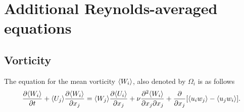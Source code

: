\documentclass[oneside,a4paper,11pt]{report}
\begin{document}
\section{Additional Reynolds-averaged equations}

\subsection{Vorticity}
The equation for the mean vorticity $\langle W_i \rangle$, also denoted by $\Omega_i$ is as follows
\begin{equation}
\frac{\partial \langle W_i \rangle}{\partial t} + \langle U_j \rangle \frac{\partial \langle W_i \rangle}{\partial x_j} = \langle W_j \rangle \frac{\partial \langle U_i \rangle}{\partial x_j} + \nu \frac{\partial^2 \langle W_i \rangle}{\partial x_j \partial x_j} + \frac{\partial}{\partial x_j} [ \langle u_i w_j \rangle - \langle u_j w_i \rangle ].
\end{equation}

\end{document}
